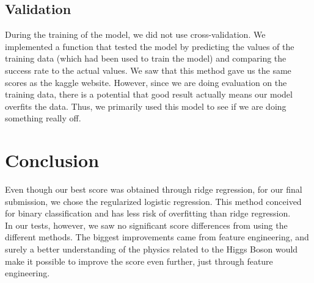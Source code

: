 \documentclass[10pt,conference,compsocconf]{IEEEtran}
\begin{document}
\subsection{Validation}

During the training of the model, we did not use cross-validation. We implemented a function that tested the model by predicting the values of the training data (which had been used to train the model) and comparing the success rate to the actual values. We saw that this method gave us the same scores as the kaggle website. However, since we are doing evaluation on the training data, there is a potential that good result actually means our model overfits the data. Thus, we primarily used this model to see if we are doing something really off. 

\section{Conclusion}

Even though our best score was obtained through ridge regression, for our final submission, we chose the regularized logistic regression. This method conceived for binary classification and has less risk of overfitting than ridge regression. \\
In our tests, however, we saw no significant score differences from using the different methods. The biggest improvements came from feature engineering, and surely a better understanding of the physics related to the Higgs Boson would make it possible to improve the score even further, just through feature engineering.
\end{document}
